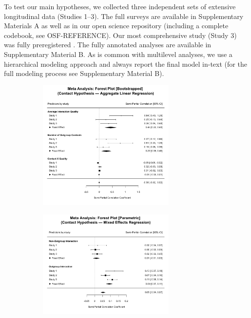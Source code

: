 \documentclass[man, 12pt, a4paper]{apa7}
\theoremstyle{break}
\theoremstyle{plain}
\begin{document}
To test our main hypotheses, we collected three independent sets of extensive longitudinal data (Studies 1–3). The full surveys are available in Supplementary Materials A as well as in our open science repository (including a complete codebook, see OSF-REFERENCE). Our most comprehensive study (Study 3) was fully preregistered  \citep[available at][]{Kreienkamp2021f}. The fully annotated analyses are available in Supplementary Material B. As is common with multilevel analyses, we use a hierarchical modeling approach and always report the final model in-text (for the full modeling process see Supplementary Material B).



\begin{figure}
  \caption{Contact Hypothesis}
  \begin{subfigure}{\textwidth}
    \caption{}
    \centering\includegraphics[width=0.75\textwidth]{Figures/forestBootstrappedGeneralLm.png}
  \end{subfigure}
  \begin{subfigure}{\textwidth}
    \caption{}
    \centering\includegraphics[width=0.75\textwidth]{Figures/forestParametricFEGeneralLmer.png}

\end{subfigure}
\end{figure}
\end{document}

